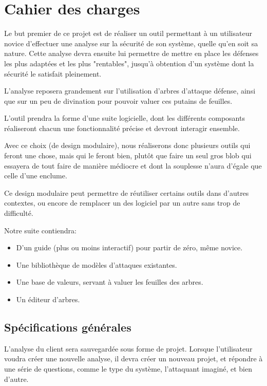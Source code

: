 \chapter{Cahier des charges}
    Le but premier de ce projet est de réaliser un outil permettant à un utilisateur novice d'effectuer une analyse sur la sécurité de son système, quelle qu'en soit sa nature. Cette analyse devra ensuite lui permettre de mettre en place les défenses les plus adaptées et les plus "rentables", jusqu'à obtention d'un système dont la sécurité le satisfait pleinement.
    
    L'analyse reposera grandement sur l'utilisation d'arbres d'attaque défense, ainsi que sur un peu de divination pour pouvoir valuer ces putains de feuilles.
    
    L'outil prendra la forme d'une suite logicielle, dont les différents composants réaliseront chacun une fonctionnalité précise et devront interagir ensemble.
    
    Avec ce choix (de design modulaire), nous réaliserons donc plusieurs outils qui feront une chose, mais qui le feront bien, plutôt que faire un seul gros blob qui essayera de tout faire de manière médiocre et dont la souplesse n'aura d'égale que celle d'une enclume.
    
    Ce design modulaire peut permettre de réutiliser certains outils dans d'autres contextes, ou encore de remplacer un des logiciel par un autre sans trop de difficulté. 
    
    Notre suite contiendra:
    \begin{itemize}
        \item D'un guide (plus ou moins interactif) pour partir de zéro, même novice.
    	\item Une bibliothèque de modèles d'attaques existantes.
        \item Une base de valeurs, servant à valuer les feuilles des arbres.
        \item Un éditeur d'arbres.
    \end{itemize}
    
    \section{Spécifications générales}
        L'analyse du client sera sauvegardée sous forme de projet. Lorsque l'utilisateur voudra créer une nouvelle analyse, il devra créer un nouveau projet, et répondre à une série de questions, comme le type du système, l'attaquant imaginé, et bien d'autre.
        
